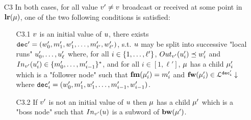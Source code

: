 \begin{definition}
\begin{itemize}
		\item[C3\namedlabel{unfoldingC3}{C3}] In both cases, for all value $v' \neq v$ broadcast or received at some point in $\mathbf{lr}(\mu)$, one of the two following conditions is satisfied:
		\begin{itemize}
			\item[C3.1\namedlabel{unfoldingC3.1}{C3.1}]
			 $v$ is an initial value of $u$, 
			there exists $\mathtt{dec}' = (w'_0, m'_1, w'_1, \ldots, m'_{\ell'}, w'_{\ell'})$, s.t. $u$ may be split into successive "local runs" $u'_0, \dots, u'_{\ell}$ where, for all $i \in \{1,\dots,\ell'\}$, $\voutput{\aval'}{\localrun'_i} \subword w'_i$ and $\vinput{\aval'}{\localrun'_i} \in \set{m'_0, \dots, m'_{i-1}}^*$, and
			for all $i \in [1,\ell']$, $\mu$ has a child $\mu'_i$ which is a "follower node" such that $\mathbf{fm}(\mu'_i) = m'_i$ and $\mathbf{fw}(\mu'_i) \in\mathcal{L}^{\mathtt{\mathtt{dec}'_i}}\downarrow$ where $\mathtt{dec}'_i = (w'_0, m'_1, w'_1, \ldots, m'_{i-1}, w'_{i-1})$.
			
			\item[C3.2\namedlabel{unfoldingC3.2}{C3.2}] If $v'$ is not an initial value of $u$ then $\mu$ has a child $\mu'$ which is a "boss node" such that $\vinput{\aval'}{\localrun}$ is a subword of $\mathbf{bw}(\mu')$.
		\end{itemize}
	\end{itemize}
	
	
\end{definition}


